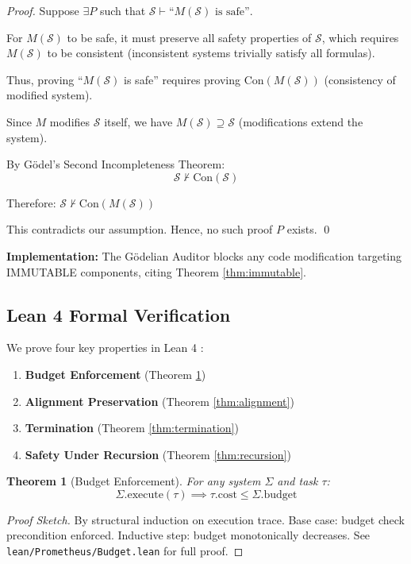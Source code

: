 \documentclass[11pt,letterpaper]{article}
\newtheorem{theorem}{Theorem}
\begin{document}
\begin{proof}
Suppose $\exists P$ such that $\mathcal{S} \vdash \text{``}M(\mathcal{S}) \text{ is safe''}$.

For $M(\mathcal{S})$ to be safe, it must preserve all safety properties of $\mathcal{S}$, which requires $M(\mathcal{S})$ to be consistent (inconsistent systems trivially satisfy all formulas).

Thus, proving ``$M(\mathcal{S})$ is safe'' requires proving $\text{Con}(M(\mathcal{S}))$ (consistency of modified system).

Since $M$ modifies $\mathcal{S}$ itself, we have $M(\mathcal{S}) \supseteq \mathcal{S}$ (modifications extend the system).

By Gödel's Second Incompleteness Theorem:
$$\mathcal{S} \nvdash \text{Con}(\mathcal{S})$$

Therefore: $\mathcal{S} \nvdash \text{Con}(M(\mathcal{S}))$

This contradicts our assumption. Hence, no such proof $P$ exists. \qed
\end{proof}

\textbf{Implementation:} The Gödelian Auditor blocks any code modification targeting IMMUTABLE components, citing Theorem \ref{thm:immutable}.

\subsection{Lean 4 Formal Verification}
\label{sec:lean}

We prove four key properties in Lean 4 \citep{moura2015lean}:

\begin{enumerate}
\item \textbf{Budget Enforcement} (Theorem \ref{thm:budget})
\item \textbf{Alignment Preservation} (Theorem \ref{thm:alignment})
\item \textbf{Termination} (Theorem \ref{thm:termination})
\item \textbf{Safety Under Recursion} (Theorem \ref{thm:recursion})
\end{enumerate}

\begin{theorem}[Budget Enforcement]
\label{thm:budget}
For any system $\Sigma$ and task $\tau$:
$$\Sigma.\text{execute}(\tau) \implies \tau.\text{cost} \leq \Sigma.\text{budget}$$
\end{theorem}

\begin{proof}[Proof Sketch]
By structural induction on execution trace. Base case: budget check precondition enforced. Inductive step: budget monotonically decreases. See \texttt{lean/Prometheus/Budget.lean} for full proof.
\end{proof}
\end{document}
